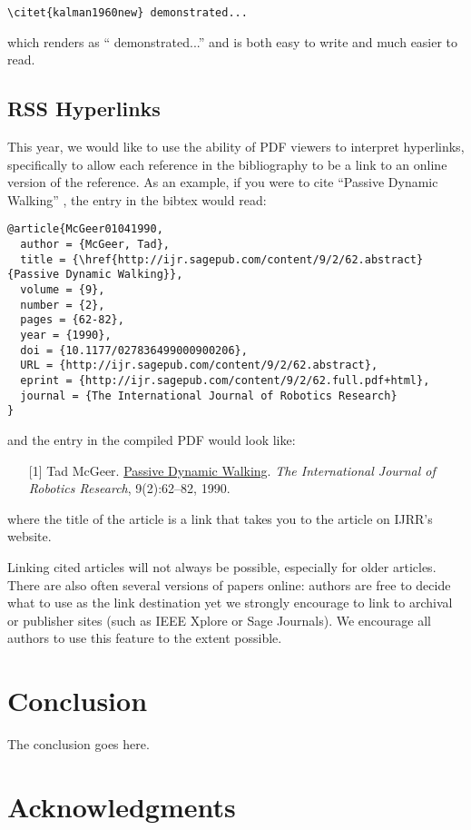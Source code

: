 \documentclass[conference]{IEEEtran}
\begin{document}
{\small
\begin{verbatim}
\citet{kalman1960new} demonstrated... 
\end{verbatim}
}
\noindent
which renders as ``\citet{kalman1960new} demonstrated...'' and is 
both easy to write and much easier to read.
  
\subsection{RSS Hyperlinks}

This year, we would like to use the ability of PDF viewers to interpret
hyperlinks, specifically to allow each reference in the bibliography to be a
link to an online version of the reference. 
As an example, if you were to cite ``Passive Dynamic Walking''
\cite{McGeer01041990}, the entry in the bibtex would read:

{\small
\begin{verbatim}
@article{McGeer01041990,
  author = {McGeer, Tad}, 
  title = {\href{http://ijr.sagepub.com/content/9/2/62.abstract}{Passive Dynamic Walking}}, 
  volume = {9}, 
  number = {2}, 
  pages = {62-82}, 
  year = {1990}, 
  doi = {10.1177/027836499000900206}, 
  URL = {http://ijr.sagepub.com/content/9/2/62.abstract}, 
  eprint = {http://ijr.sagepub.com/content/9/2/62.full.pdf+html}, 
  journal = {The International Journal of Robotics Research}
}
\end{verbatim}
}
\noindent
and the entry in the compiled PDF would look like:

\def\tmplabel#1{[#1]}

\begin{enumerate}
\item[\tmplabel{1}] Tad McGeer. \href{http://ijr.sagepub.com/content/9/2/62.abstract}{Passive Dynamic
Walking}. {\em The International Journal of Robotics Research}, 9(2):62--82,
1990.
\end{enumerate}
%
where the title of the article is a link that takes you to the article on IJRR's website. 


Linking cited articles will not always be possible, especially for
older articles. There are also often several versions of papers
online: authors are free to decide what to use as the link destination
yet we strongly encourage to link to archival or publisher sites
(such as IEEE Xplore or Sage Journals).  We encourage all authors to use this feature to
the extent possible.

\section{Conclusion} 
\label{sec:conclusion}

The conclusion goes here.

\section*{Acknowledgments}




\end{document}
